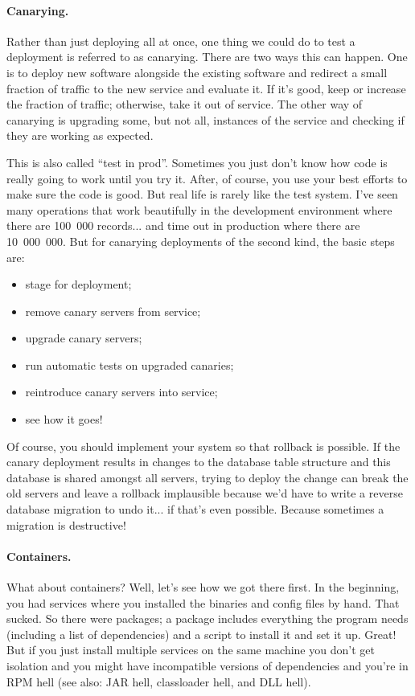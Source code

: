 \paragraph{Canarying.} Rather than just deploying all at once, one thing we could do to test a deployment is referred to as canarying. There are two ways this can happen. One is to deploy new software alongside the existing software and redirect a small fraction of traffic to the new service and evaluate it. If it's good, keep or increase the fraction of traffic; otherwise, take it out of service. The other way of canarying is upgrading some, but not all, instances of the service and checking if they are working as expected.

This is also called ``test in prod''. Sometimes you just don't know how code is really going to work until you try it. After, of course, you use your best
efforts to make sure the code is good. But real life is rarely like the test system. I've seen many operations that work beautifully in the development environment where there are 100~000 records... and time out in production where there are 10~000~000. But for canarying deployments of the second kind, the basic steps are:
\begin{itemize}[noitemsep]
\item stage for deployment;
\item remove canary servers from service;
\item upgrade canary servers;
\item run automatic tests on upgraded canaries;
\item reintroduce canary servers into service;
\item see how it goes!
\end{itemize}

Of course, you should implement your system so that rollback is possible. If the canary deployment results in changes to the database table structure and this database is shared amongst all servers, trying to deploy the change can break the old servers and leave a rollback implausible because we'd have to write a reverse database migration to undo it... if that's even possible. Because sometimes a migration is destructive!



\paragraph{Containers.} What about containers? Well, let's see how we got there first. In the beginning, you had services where you installed the binaries and config files by hand. That sucked. So there were packages; a package includes everything the program needs (including a list of dependencies) and a script to install it and set it up. Great! But if you just install multiple services on the same machine you don't get isolation and you might have incompatible versions of dependencies and you're in RPM hell (see also: JAR hell, classloader hell, and DLL hell).

